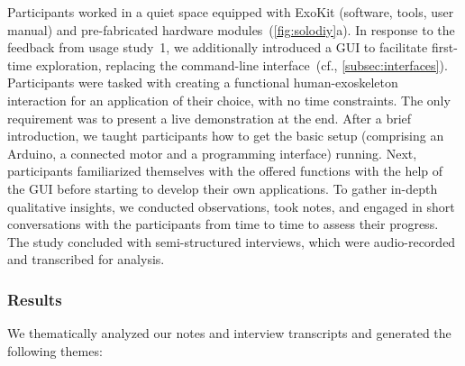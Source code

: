  Participants worked in a quiet space equipped with ExoKit (software, tools, user manual) and pre-fabricated hardware modules~(\autoref{fig:solodiy}a). In response to the feedback from usage study~1, we additionally introduced a GUI to facilitate first-time exploration, replacing the command-line interface~(cf., \autoref{subsec:interfaces}).
Participants were tasked with creating a functional human-exoskeleton interaction for an application of their choice, with no time constraints. The only requirement was to present a live demonstration at the end. 
After a brief introduction, we taught participants how to get the basic setup (comprising an Arduino, a connected motor and a programming interface) running. Next, participants familiarized themselves with the offered functions with the help of the GUI before starting to develop their own applications.
To gather in-depth qualitative insights, we conducted observations, took notes, and engaged in short conversations with the participants from time to time to assess their progress. 
The study concluded with semi-structured interviews, which were audio-recorded and transcribed for analysis.


\subsubsection{Results}
We thematically analyzed our notes and interview transcripts and generated the following themes: 

	

